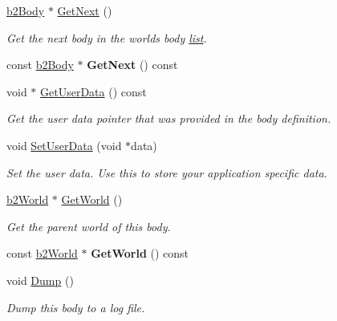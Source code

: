 \begin{DoxyCompactItemize}
\hyperlink{classb2Body}{b2\+Body} $\ast$ \hyperlink{classb2Body_ad6ce9d4ac8eacea074f3198393a5d508}{Get\+Next} ()
\begin{DoxyCompactList}\small\item\em Get the next body in the world\textquotesingle{}s body \hyperlink{protocollist-p}{list}. \end{DoxyCompactList}\item 
\mbox{\label{classb2Body_ad14be276c67c93e1bc859df14057ab52}} 
const \hyperlink{classb2Body}{b2\+Body} $\ast$ {\bfseries Get\+Next} () const
\item 
\mbox{\label{classb2Body_afc0f5338b6f2b62a45bdd580de602ecf}} 
void $\ast$ \hyperlink{classb2Body_afc0f5338b6f2b62a45bdd580de602ecf}{Get\+User\+Data} () const
\begin{DoxyCompactList}\small\item\em Get the user data pointer that was provided in the body definition. \end{DoxyCompactList}\item 
\mbox{\label{classb2Body_a5553a5ecdfd2d7200ba2405ce6043f52}} 
void \hyperlink{classb2Body_a5553a5ecdfd2d7200ba2405ce6043f52}{Set\+User\+Data} (void $\ast$data)
\begin{DoxyCompactList}\small\item\em Set the user data. Use this to store your application specific data. \end{DoxyCompactList}\item 
\mbox{\label{classb2Body_a18d04c6677917a35ee90da1112fc1245}} 
\hyperlink{classb2World}{b2\+World} $\ast$ \hyperlink{classb2Body_a18d04c6677917a35ee90da1112fc1245}{Get\+World} ()
\begin{DoxyCompactList}\small\item\em Get the parent world of this body. \end{DoxyCompactList}\item 
\mbox{\label{classb2Body_a5d818ba53f7434cf5f844cca54b0aec8}} 
const \hyperlink{classb2World}{b2\+World} $\ast$ {\bfseries Get\+World} () const
\item 
\mbox{\label{classb2Body_ac9e482f7d9df92801c24e79a7e751d06}} 
void \hyperlink{classb2Body_ac9e482f7d9df92801c24e79a7e751d06}{Dump} ()
\begin{DoxyCompactList}\small\item\em Dump this body to a log file. \end{DoxyCompactList}\end{DoxyCompactItemize}
